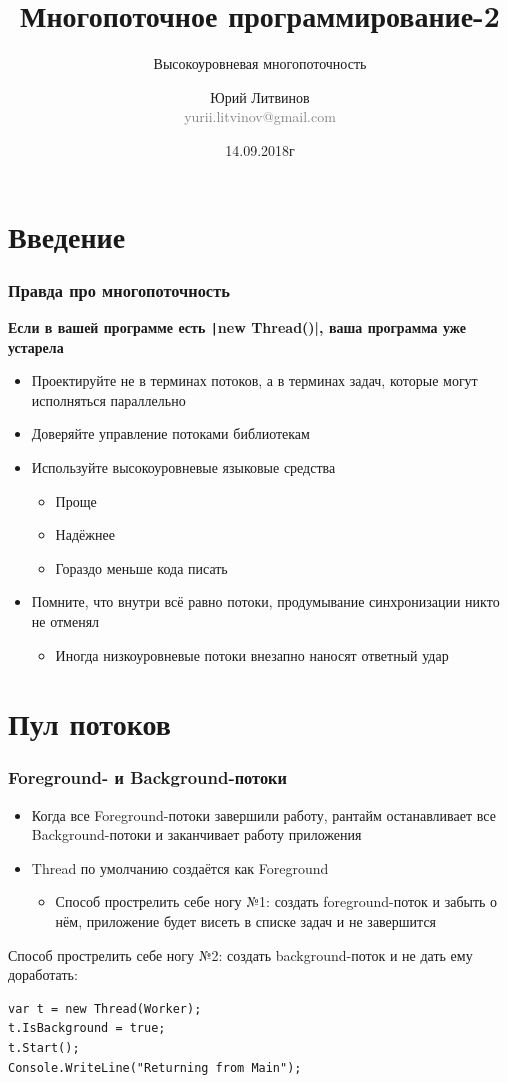 \documentclass[xetex,mathserif,serif]{beamer}
\title{Многопоточное программирование-2}
\subtitle{Высокоуровневая многопоточность}
\author[Юрий Литвинов]{Юрий Литвинов\\\small{\textcolor{gray}{yurii.litvinov@gmail.com}}}
\date{14.09.2018г}
\begin{document}
	\frame{\titlepage}

	\section{Введение}

	\begin{frame}
		\frametitle{Правда про многопоточность}
		\textbf{Если в вашей программе есть \texttt|new Thread()|, ваша программа уже устарела}
		\begin{itemize}
			\item Проектируйте не в терминах потоков, а в терминах задач, которые могут исполняться параллельно
			\item Доверяйте управление потоками библиотекам
			\item Используйте высокоуровневые языковые средства
			\begin{itemize}
				\item Проще
				\item Надёжнее
				\item Гораздо меньше кода писать
			\end{itemize}
			\item Помните, что внутри всё равно потоки, продумывание синхронизации никто не отменял
			\begin{itemize}
				\item Иногда низкоуровневые потоки внезапно наносят ответный удар
			\end{itemize}
		\end{itemize}
	\end{frame}

	\section{Пул потоков}

	\begin{frame}[fragile]
		\frametitle{Foreground- и Background-потоки}
		\begin{itemize}
			\item Когда все Foreground-потоки завершили работу, рантайм останавливает все Background-потоки и заканчивает работу приложения
			\item Thread по умолчанию создаётся как Foreground
			\begin{itemize}
				\item Способ прострелить себе ногу №1: создать foreground-поток и забыть о нём, приложение будет висеть в списке задач и не завершится
			\end{itemize}
		\end{itemize}
		\vspace{5mm}
		Способ прострелить себе ногу №2: создать background-поток и не дать ему доработать:
		\begin{verbatim}
var t = new Thread(Worker);
t.IsBackground = true;
t.Start();
Console.WriteLine("Returning from Main");
		\end{verbatim}
	\end{frame}
\end{document}
